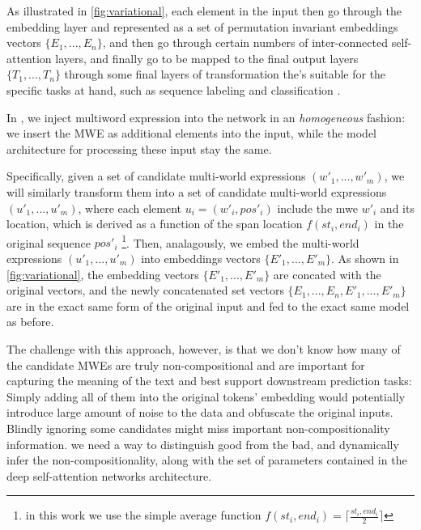 As illustrated in \autoref{fig:variational}, each element in the input then go through the embedding layer and represented as a set of permutation invariant embeddings vectors $\{E_1, ..., E_n\}$, 
\cite{vaswani2017attention}
and then go through certain numbers of inter-connected self-attention layers, and finally go   to be mapped to the final output layers
$\{T_1, ..., T_n\}$
through some final layers of transformation the's suitable for the specific tasks at hand,  such as sequence labeling and classification \cite{devlin2018bert}.

In \BertMWE, we inject multiword expression into the network in an \textit{homogeneous} fashion: we insert the MWE as additional elements into the input, while the model architecture for processing these input stay the same. 

Specifically, given a set of candidate multi-world expressions $(w'_1, ..., w'_m)$, 
we will similarly transform them into a set of candidate multi-world expressions $(u'_1, ..., u'_m)$, where each element $u_i=(w'_i, pos'_i)$ include the mwe $w'_i$ and its location, which is derived as a function of the span location $f(st_i, end_i)$ in the original sequence $pos'_i$ \footnote{in this work we use the simple average function $f(st_i, end_i) = \lceil \frac{st_i, end_i}{2} \rceil $}.
Then, analagously, we embed the multi-world expressions $(u'_1, ..., u'_m)$ into embeddings vectors $\{E'_1, ..., E'_m\}$.
As shown in \autoref{fig:variational}, the embedding vectors $\{E'_1, ..., E'_m\}$ are concated  with the original vectors, and the newly concatenated set vectors 
$\{E_1, ..., E_n, E'_1, ..., E'_m\}$ are in the exact same form of the original input and fed to the exact same model as before.

The challenge with this approach, however, is that we don't know how many of the candidate MWEs are truly non-compositional and are important for capturing the meaning of the text and best support downstream prediction tasks:
Simply adding all of them into the original tokens' embedding would potentially introduce large amount of noise to the data and obfuscate the original inputs. Blindly ignoring some candidates might miss important non-compositionality information.
we need a way to distinguish good from the bad, and dynamically infer the non-compositionality, along with the set of parameters contained in the deep self-attention networks architecture.


